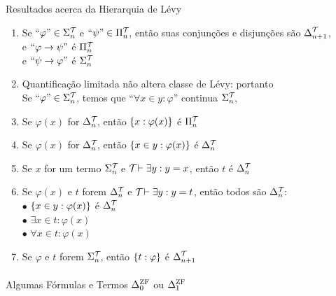 \begin{theorem}{Resultados acerca da Hierarquia de Lévy}
\begin{enumerate}[label=(\alph*)]
                        \item Se $\text{``}\varphi\text{''}\in\Sigma^{\mathcal{T}_{}}_{n}$ e $\text{``}\psi\text{''}\in\Pi^{\mathcal{T}_{}}_{n}$, então suas conjunções e disjunções
                            são $\Delta^{\mathcal{T}_{}}_{n+1}$,\\ 
                            e $\text{``}\varphi\rightarrow\psi\text{''}$ é $\Pi^{\mathcal{T}_{}}_{n}$\\
                            e $\text{``}\psi\rightarrow\varphi\text{''}$ é $\Sigma^{\mathcal{T}_{}}_{n}$
                        \item Quantificação limitada não altera classe de Lévy: portanto\\
                                Se $\text{``}\varphi\text{''}\in\Sigma^{\mathcal{T}_{}}_{n}$, temos que ``$\forall x\in y:\varphi$'' continua $\Sigma^{\mathcal{T}_{}}_{n}$,
                        \item Se $\varphi(x)$ for         $\Delta^{\mathcal{T}_{}}_{n}$,  então $\SET{x:\varphi(x)}$ é $\Pi^{\mathcal{T}_{}}_{n}$
                        \item Se $\varphi(x)$ for         $\Delta^{\mathcal{T}_{}}_{n}$,  então $\SET{x\in y:\varphi(x)}$ é $\Delta^{\mathcal{T}_{}}_{n}$
                        \item Se $x$ for um termo         $\Sigma^{\mathcal{T}_{}}_{n}$   e $\mathcal{T}_{}\vdash\exists y: y = x$, então $t$ é $\Delta^{\mathcal{T}_{}}_{n}$
                        \item Se $\varphi(x)$ e $t$ forem $\Delta^{\mathcal{T}_{}}_{n}$   e $\mathcal{T}_{}\vdash\exists y: y = t$, então todos são $\Delta^{\mathcal{T}_{}}_{n}$:\\
                                $\bullet$ $\SET{x\in y:\varphi(x)}$ é $\Delta^{\mathcal{T}_{}}_{n}$   \\
                                $\bullet$ $\exists x\in t: \varphi(x)$                          \\
                                $\bullet$ $\forall x\in t: \varphi(x)$                          
                        \item Se $\varphi$ e $t$ forem $\Sigma^{\mathcal{T}_{}}_{n}$, então $\SET{t:\varphi}$ é $\Delta^{\mathcal{T}_{}}_{n+1}$
                        \end{enumerate}
                    \paragraph{}
                    \begin{lemma}{Algumas Fórmulas e Termos $\Delta^{\text{\sc ZF}}_{0}$ ou $\Delta^{\text{\sc ZF}}_{1}$}
                        {

}
\end{lemma}
\end{theorem}
